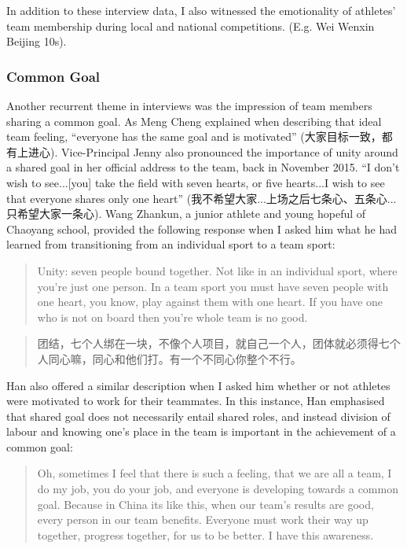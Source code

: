\begin{CJK}{UTF8}{gbsn}
In addition to these interview data, I also witnessed the emotionality of athletes' team membership during local and national competitions.  (E.g. Wei Wenxin Beijing 10s).



\subsubsection{Common Goal}

Another recurrent theme in interviews was the impression of team members sharing a common goal.  As Meng Cheng explained when describing that ideal team feeling, ``everyone has the same goal and is motivated'' (大家目标一致，都有上进心). Vice-Principal Jenny also pronounced the importance of unity around a shared goal in her official address to the team, back in November 2015.  ``I don't wish to see...[you] take the field with seven hearts, or five hearts...I wish to see that everyone shares only one heart'' (我不希望大家...上场之后七条心、五条心...只希望大家一条心).  Wang Zhankun, a junior athlete and young hopeful of Chaoyang school, provided the following response when I asked him what he had learned from transitioning from an individual sport to a team sport:

  \begin{quote}
    Unity: seven people bound together.  Not like in an individual sport, where you’re just one person. In a team sport you must have seven people with one heart, you know, play against them with one heart.  If you have one who is not on board then you’re whole team is no good.
  \end{quote}

  \begin{quote}
    团结，七个人绑在一块，不像个人项目，就自己一个人，团体就必须得七个人同心嘛，同心和他们打。有一个不同心你整个不行。
  \end{quote}

  Han also offered a similar description when I asked him whether or not athletes were motivated to work for their teammates. In this instance, Han emphasised that shared goal does not necessarily  entail shared roles, and instead division of labour and knowing one's place in the team is important in the achievement of a common goal:

    \begin{quote}
        Oh, sometimes I feel that there is such a feeling, that we are all a team, I do my job, you do your job, and everyone is developing towards a common goal.  Because in China its like this, when our team’s results are good, every person in our team benefits.  Everyone must work their way up together, progress together, for us to be better. I have this awareness.
    \end{quote}


\end{CJK}

